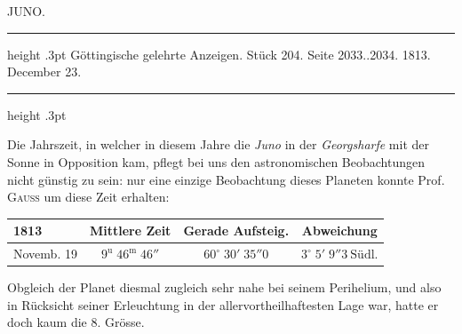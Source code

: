 \par\bigskip
{}
\hypertarget{native-377-lower}{}\label{native-377-lower}
\begin{center}\large JUNO.\end{center}
\begin{center}
\parbox{.82\linewidth}{%
\centering\fontsize{8.2}{10.2}\selectfont
\hrule height .3pt\relax\vspace{2.5pt}
Göttingische gelehrte Anzeigen. Stück 204. Seite 2033..2034. 1813. December 23.\par
\vspace{2.5pt}\hrule height .3pt\relax
}
\end{center}


\par\indent Die Jahrszeit, in welcher in diesem Jahre die \emph{Juno} in der \emph{Georgsharfe} mit der Sonne in Opposition kam, pflegt bei uns den astronomischen Beobachtungen nicht günstig zu sein: nur eine einzige Beobachtung dieses Planeten konnte Prof. \textsc{Gauss} um diese Zeit erhalten:
\begin{center}\fontsize{10}{12}\selectfont\setlength{\tabcolsep}{4pt}\renewcommand{\arraystretch}{1.15}\begin{tabular}{l|c|c|c}
1813 & Mittlere Zeit & Gerade Aufsteig. & Abweichung\\\hline
Novemb. 19 & $9^{\mathrm u}\;46^{\mathrm m}\;46''$ & $60^\circ\;30'\;35''0$ & $3^\circ\;5'\;9''3\ \text{Südl.}$\\
\end{tabular}\end{center}
\par\indent Obgleich der Planet diesmal zugleich sehr nahe bei seinem Perihelium, und also in Rücksicht seiner Erleuchtung in der allervortheilhaftesten Lage war, hatte er doch kaum die 8. Grösse.


